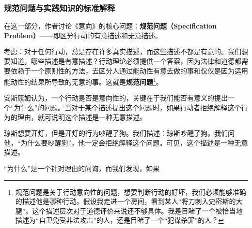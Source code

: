 \documentclass[12pt, a4paper, oneside]{ctexart}
\renewcommand{\b}{\textbf}
\newcommand{\f}{\footnote}
\begin{document}
\subsubsection{规范问题与实践知识的标准解释}
在这一部分，作者讨论《意向》的核心问题：\b{规范问题（Specification Problem）}——即区分行动的有意描述和无意描述。

考虑：对于任何行动，总是存在许多真实描述，而这些描述不都是有意的。我们想要知道，哪些描述是有意描述？行动理论必须提供一个答案，因为法律和道德都需要依赖于一个原则性的方法，去区分人通过能动性有意去做的事和仅仅是因为运用能动性的结果所导致的无意的事。这就是\b{规范问题}\f{规范问题是关于行动意向性的问题，想要判断行动的好坏，我们必须能够准确的描述他是哪种行动。假设我走进一个房间，看到某人“将刀刺入史密斯的大腿”。这个描述层次对于道德评价来说还不够具体。我是目睹了一个被恰当地描述为“自卫免受非法攻击”的人，还是目睹了一个“犯谋杀罪”的人？}。

安斯康姆认为，一个行动是否是意向性的，关键在于我们能否有意义的提出一个“为什么”的问题。当对于某个描述提出这个问题时，如果行动者拒绝解释这个行为的理由，就可说明这个描述是一种无意描述。

琼斯想要开灯，但是开灯的行为吵醒了狗。我们描述：琼斯吵醒了狗。我们问他，“为什么要吵醒狗”，他一定会拒绝解释这个问题。可见，这个描述是一种无意描述。

“为什么”是一个针对理由的问询，而我们发现，如果
\end{document}
